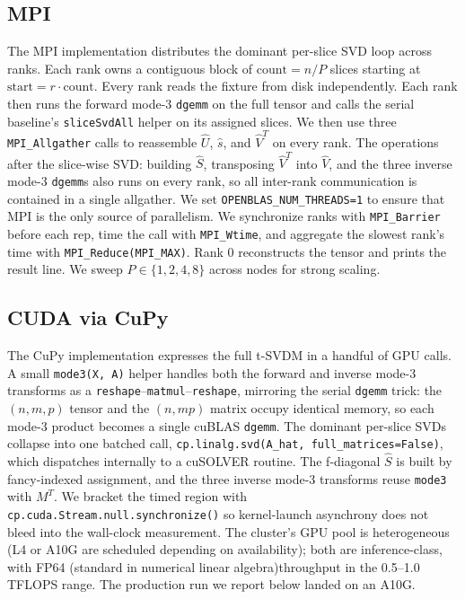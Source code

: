 \documentclass{article}
\begin{document}
\subsection{MPI}
The MPI implementation distributes the dominant per-slice SVD loop across
ranks. Each rank owns a contiguous block of $\mathrm{count} = n / P$
slices starting at $\mathrm{start} = r \cdot \mathrm{count}$. Every rank reads the
fixture from disk independently. Each rank then runs the forward
mode-3 \texttt{dgemm} on the full tensor and calls the serial baseline's
\texttt{sliceSvdAll} helper on its assigned slices. We then use three 
\texttt{MPI\_Allgather} calls to reassemble $\hat{U}$,
$\hat{s}$, and $\hat{V}^T$ on every rank. The operations after the slice-wise SVD: building
$\hat{S}$, transposing $\hat{V}^T$ into $\hat{V}$, and the three inverse
mode-3 \texttt{dgemm}s also runs on every rank, so all inter-rank
communication is contained in a single allgather. We set 
\texttt{OPENBLAS\_NUM\_THREADS=1} to ensure that MPI is  the only source of
parallelism. We synchronize ranks with \texttt{MPI\_Barrier} before each rep, time the call with \texttt{MPI\_Wtime}, and    
aggregate the slowest rank's time with \texttt{MPI\_Reduce(MPI\_MAX)}.  Rank 0 reconstructs the tensor
and prints the result line. We sweep $P \in \{1, 2, 4, 8\}$ across
nodes for strong scaling.

\subsection{CUDA via CuPy}
The CuPy implementation expresses the full t-SVDM in a handful of GPU calls.
A small \texttt{mode3(X, A)} helper handles both the forward and inverse
mode-3 transforms as a \texttt{reshape}--\texttt{matmul}--\texttt{reshape},
mirroring the serial \texttt{dgemm} trick: the $(n, m, p)$ tensor and the
$(n, mp)$ matrix occupy identical memory, so each mode-3 product becomes a
single cuBLAS \texttt{dgemm}. The dominant per-slice SVDs collapse into one
batched call, \texttt{cp.linalg.svd(A\_hat, full\_matrices=False)}, which
dispatches internally to a cuSOLVER routine. The f-diagonal $\hat{S}$ is built by
fancy-indexed assignment, and the three inverse mode-3 transforms reuse
\texttt{mode3} with $M^T$. We bracket the timed region with
\texttt{cp.cuda.Stream.null.synchronize()} so kernel-launch asynchrony does
not bleed into the wall-clock measurement. The cluster's GPU pool is heterogeneous (L4 or
A10G are scheduled depending on availability); both are inference-class,
with FP64 (standard in numerical linear algebra)throughput in the 0.5--1.0\,TFLOPS range. The production run we
report below landed on an A10G.
\end{document}
